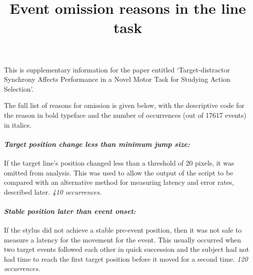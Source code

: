 \documentclass[11pt, a4paper]{article}
\title {
       Event omission reasons in the line task
}
\date{} %
\author{\Authors}
\begin{document}
\setlength{\droptitle}{-1.8cm} %
\maketitle

\vspace{-1.8cm} %

This is supplementary information for the paper entitled
`Target-distractor Synchrony Affects Performance in a Novel Motor Task
for Studying Action Selection'.


The full list of reasons for omission is given below, with the
descriptive code for the reason in bold typeface and the number of
occurrences (out of 17617 events) in italics.



\paragraph{\emph{Target position change less than minimum jump size:}} If the
target line's position changed less than a threshold of 20 pixels, it
was omitted from analysis. This was used to allow the output of the
script to be compared with an alternative method for measuring latency
and error rates, described later. \emph{410 occurrences.}

\paragraph{\emph{Stable position later than event onset:}} If the stylus did not
achieve a stable pre-event position, then it was not safe to measure a
latency for the movement for the event. This usually occurred when two
target events followed each other in quick succession and the subject
had not had time to reach the first target position before it moved
for a second time. \emph{120 occurrences.}
\end{document}
